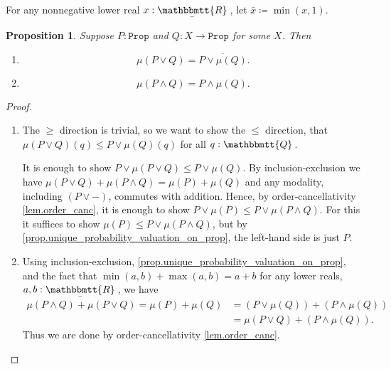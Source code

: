 \documentclass[11pt, oneside, article]{memoir}
\theoremstyle{plain}
\newtheorem{proposition}[theorem]{Proposition}
\theoremstyle{definition}
\theoremstyle{remark}
\newcommand{\const}[1]{\mathtt{#1}}
\newcommand{\ol}[1]{\overline{#1}}
\newcommand{\ubar}[1]{\underaccent{\bar}{#1}}
\newcommand{\internal}[1]{\raisebox{-.03ex}{$\mathbbmtt{#1}$}}
\newcommand{\hs}{\hspace{1.1pt}}
\newcommand{\tQQ}{\internal{Q}\hs}
\newcommand{\tRR}{\internal{R}\hs}
\newcommand{\tLR}{\ubar{\tRR}\hs}
\newcommand{\Prop}{\const{Prop}}
\begin{document}
For any nonnegative lower real $x:\tLR$, let $\bar{x}\coloneqq\min(x,1)$.

\begin{proposition}\label{prop.valuations_OR}
Suppose $P:\Prop$ and $Q:X\to\Prop$ for some $X$. Then
\begin{enumerate}
\item \[\mu(P\vee Q)=\ol{P\vee\mu(Q)}.\]
\item \[\mu(P\wedge Q) = P \wedge \mu(Q).\]
\end{enumerate}
\end{proposition} 
\begin{proof}
\begin{enumerate}
\item The $\geq$ direction is trivial, so we want to show the $\leq$ direction, that $\mu(P\vee Q)(q)\leq P\vee\mu(Q)(q)$ for all $q:\tQQ$.

It is enough to show $P\vee\mu(P\vee Q)\leq P\vee\mu(Q)$. By inclusion-exclusion we have $\mu(P\vee Q)+\mu(P\wedge Q)=\mu(P)+\mu(Q)$ and any modality, including $(P\vee-)$, commutes with addition. Hence, by order-cancellativity \cref{lem.order_canc}, it is enough to show $P\vee\mu(P)\leq P\vee\mu(P\wedge Q)$.
For this it suffices to show $\mu(P)\leq P\vee\mu(P\wedge Q)$, but by \cref{prop.unique_probability_valuation_on_prop}, the left-hand side is just $P$.
\item Using inclusion-exclusion, \cref{prop.unique_probability_valuation_on_prop}, and the fact that $\min(a,b)+\max(a,b)=a+b$ for any lower reals, $a,b:\tLR$, we have
\begin{align*}
	\mu(P\wedge Q)+\mu(P\vee Q)=\mu(P)+\mu(Q)
	&=(P\vee\mu(Q))+(P\wedge\mu(Q))\\
	&=\mu(P\vee Q)+(P\wedge\mu(Q)).
\end{align*}
Thus we are done by order-cancellativity \cref{lem.order_canc}.
\end{enumerate}
\end{proof}
\end{document}

